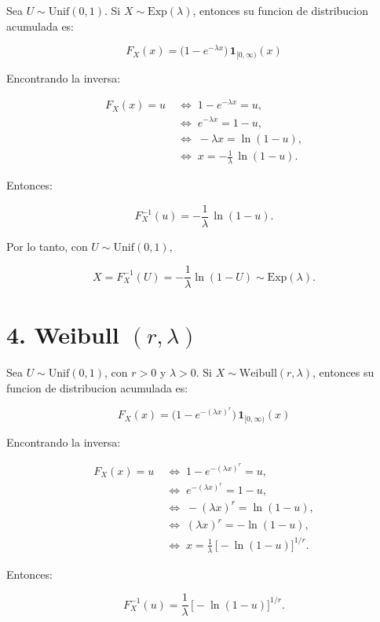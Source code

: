 \documentclass[10pt,a4paper]{article}
\begin{document}
    Sea \textbf{\(U\sim\mathrm{Unif}(0,1)\)}. Si
\(X\sim\mathrm{Exp}(\lambda)\), entonces su funcion de distribucion
acumulada es:

\[
F_X(x)=\bigl(1-e^{-\lambda x}\bigr)\,\mathbf{1}_{[0,\infty)}(x)
\]

Encontrando la inversa:

\[
\begin{aligned}
F_X(x)=u &\;\iff\; 1-e^{-\lambda x}=u,\\
         &\;\iff\; e^{-\lambda x}=1-u,\\
         &\;\iff\; -\lambda x=\ln(1-u),\\
         &\;\iff\; x=-\frac{1}{\lambda}\,\ln(1-u).
\end{aligned}
\]

Entonces:

\[
F_X^{-1}(u)=-\frac{1}{\lambda}\,\ln(1-u).
\]

Por lo tanto, con \(U\sim\mathrm{Unif}(0,1)\),

\[
X=F_X^{-1}(U)=-\frac{1}{\lambda}\ln(1-U)\sim\mathrm{Exp}(\lambda).
\]

    \hypertarget{weibull-rlambda}{%
\section{\texorpdfstring{4. Weibull
\((r,\lambda)\)}{4. Weibull (r,\textbackslash lambda)}}\label{weibull-rlambda}}

    Sea \textbf{\(U\sim\mathrm{Unif}(0,1)\)}, con \(r>0\) y \(\lambda>0\).
Si \(X\sim\mathrm{Weibull}(r,\lambda)\), entonces su funcion de
distribucion acumulada es:

\[
F_X(x)=\bigl(1-e^{-(\lambda x)^r}\bigr)\,\mathbf{1}_{[0,\infty)}(x)
\]

Encontrando la inversa:

\[
\begin{aligned}
F_X(x)=u &\;\iff\; 1-e^{-(\lambda x)^r}=u,\\
         &\;\iff\; e^{-(\lambda x)^r}=1-u,\\
         &\;\iff\; -(\lambda x)^r=\ln(1-u),\\
         &\;\iff\; (\lambda x)^r=-\ln(1-u),\\
         &\;\iff\; x=\frac{1}{\lambda}\,\bigl[-\ln(1-u)\bigr]^{1/r}.
\end{aligned}
\]

Entonces:

\[
F_X^{-1}(u)=\frac{1}{\lambda}\,\bigl[-\ln(1-u)\bigr]^{1/r}.
\]
\end{document}
